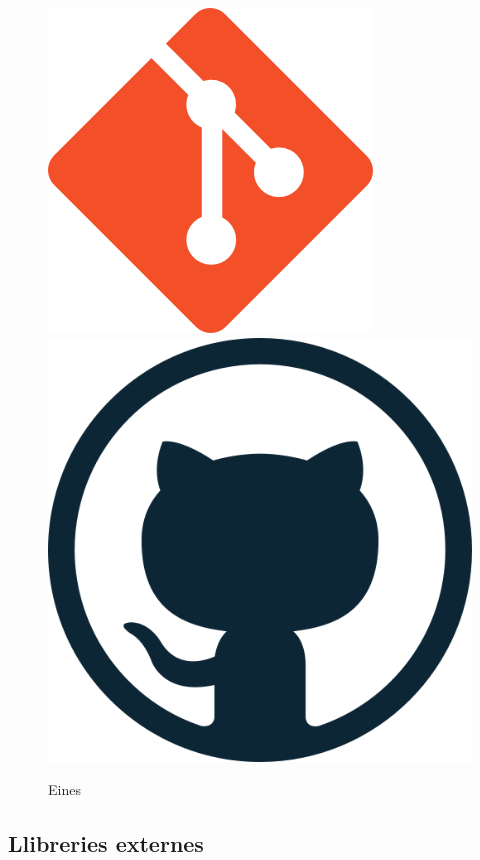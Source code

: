 \begin{figure}[H]
\hspace{0.1cm}
\includegraphics[scale=0.2]{Figures/git.png}
\hspace{0.2cm}
\includegraphics[scale=0.13]{Figures/github.png}
\caption{Eines}
\end{figure}

\subsection{Llibreries externes}

